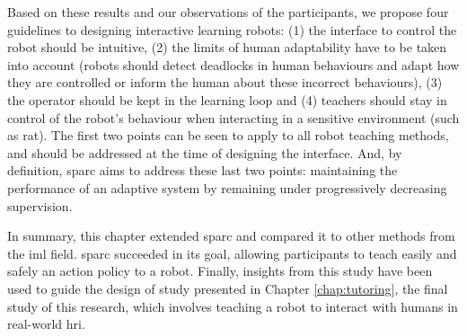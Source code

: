 Based on these results and our observations of the participants, we propose four guidelines to designing interactive learning robots: (1) the interface to control the robot should be intuitive, (2) the limits of human adaptability have to be taken into account (robots should detect deadlocks in human behaviours and adapt how they are controlled or inform the human about these incorrect behaviours), (3) the operator should be kept in the learning loop and (4) teachers should stay in control of the robot's behaviour when interacting in a sensitive environment (such as \gls{rat}). The first two points can be seen to apply to all robot teaching methods, and should be addressed at the time of designing the interface. And, by definition, \gls{sparc} aims to address these last two points: maintaining the performance of an adaptive system by remaining under progressively decreasing supervision.

In summary, this chapter extended \gls{sparc} and compared it to other methods from the \gls{iml} field. \gls{sparc} succeeded in its goal, allowing participants to teach easily and safely an action policy to a robot. Finally, insights from this study have been used to guide the design of study presented in Chapter \ref{chap:tutoring}, the final study of this research, which involves teaching a robot to interact with humans in real-world \gls{hri}.


